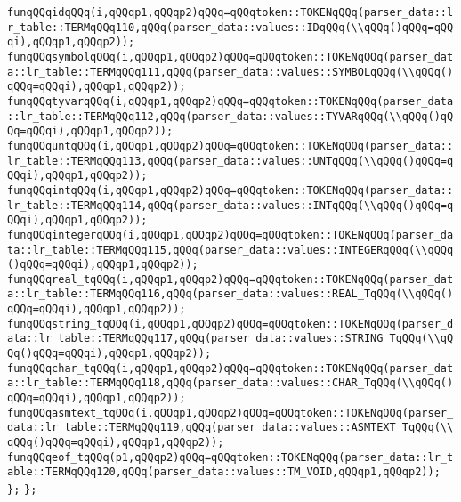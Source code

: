 \verb|funqQQqidqQQq(i,qQQqp1,qQQqp2)qQQq=qQQqtoken::TOKENqQQq(parser_data::lr_table::TERMqQQq110,qQQq(parser_data::values::IDqQQq(\\qQQq()qQQq=qQQqi),qQQqp1,qQQqp2));|\newline
\verb|funqQQqsymbolqQQq(i,qQQqp1,qQQqp2)qQQq=qQQqtoken::TOKENqQQq(parser_data::lr_table::TERMqQQq111,qQQq(parser_data::values::SYMBOLqQQq(\\qQQq()qQQq=qQQqi),qQQqp1,qQQqp2));|\newline
\verb|funqQQqtyvarqQQq(i,qQQqp1,qQQqp2)qQQq=qQQqtoken::TOKENqQQq(parser_data::lr_table::TERMqQQq112,qQQq(parser_data::values::TYVARqQQq(\\qQQq()qQQq=qQQqi),qQQqp1,qQQqp2));|\newline
\verb|funqQQquntqQQq(i,qQQqp1,qQQqp2)qQQq=qQQqtoken::TOKENqQQq(parser_data::lr_table::TERMqQQq113,qQQq(parser_data::values::UNTqQQq(\\qQQq()qQQq=qQQqi),qQQqp1,qQQqp2));|\newline
\verb|funqQQqintqQQq(i,qQQqp1,qQQqp2)qQQq=qQQqtoken::TOKENqQQq(parser_data::lr_table::TERMqQQq114,qQQq(parser_data::values::INTqQQq(\\qQQq()qQQq=qQQqi),qQQqp1,qQQqp2));|\newline
\verb|funqQQqintegerqQQq(i,qQQqp1,qQQqp2)qQQq=qQQqtoken::TOKENqQQq(parser_data::lr_table::TERMqQQq115,qQQq(parser_data::values::INTEGERqQQq(\\qQQq()qQQq=qQQqi),qQQqp1,qQQqp2));|\newline
\verb|funqQQqreal_tqQQq(i,qQQqp1,qQQqp2)qQQq=qQQqtoken::TOKENqQQq(parser_data::lr_table::TERMqQQq116,qQQq(parser_data::values::REAL_TqQQq(\\qQQq()qQQq=qQQqi),qQQqp1,qQQqp2));|\newline
\verb|funqQQqstring_tqQQq(i,qQQqp1,qQQqp2)qQQq=qQQqtoken::TOKENqQQq(parser_data::lr_table::TERMqQQq117,qQQq(parser_data::values::STRING_TqQQq(\\qQQq()qQQq=qQQqi),qQQqp1,qQQqp2));|\newline
\verb|funqQQqchar_tqQQq(i,qQQqp1,qQQqp2)qQQq=qQQqtoken::TOKENqQQq(parser_data::lr_table::TERMqQQq118,qQQq(parser_data::values::CHAR_TqQQq(\\qQQq()qQQq=qQQqi),qQQqp1,qQQqp2));|\newline
\verb|funqQQqasmtext_tqQQq(i,qQQqp1,qQQqp2)qQQq=qQQqtoken::TOKENqQQq(parser_data::lr_table::TERMqQQq119,qQQq(parser_data::values::ASMTEXT_TqQQq(\\qQQq()qQQq=qQQqi),qQQqp1,qQQqp2));|\newline
\verb|funqQQqeof_tqQQq(p1,qQQqp2)qQQq=qQQqtoken::TOKENqQQq(parser_data::lr_table::TERMqQQq120,qQQq(parser_data::values::TM_VOID,qQQqp1,qQQqp2));|\newline
\verb|};|\newline
\verb|};|\newline

